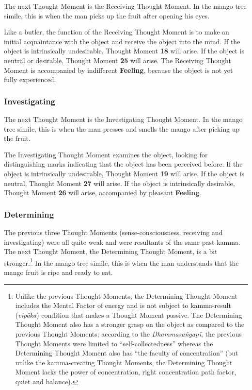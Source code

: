 The next Thought Moment is the Receiving Thought Moment. In the mango tree simile, this is when the man picks up the fruit after opening his eyes.

Like a butler, the function of the Receiving Thought Moment is to make an initial acquaintance with the object and receive the object into the mind. If the object is intrinsically undesirable, Thought Moment \textbf{18} will arise. If the object is neutral or desirable, Thought Moment \textbf{25} will arise. The Receiving Thought Moment is accompanied by indifferent \textbf{Feeling}, because the object is not yet fully experienced.

\subsubsection*{Investigating}

The next Thought Moment is the Investigating Thought Moment. In the mango tree simile, this is when the man presses and smells the mango after picking up the fruit.

The Investigating Thought Moment examines the object, looking for distinguishing marks indicating that the object has been perceived before. If the object is intrinsically undesirable, Thought Moment \textbf{19} will arise. If the object is neutral, Thought Moment \textbf{27} will arise. If the object is intrinsically desirable, Thought Moment \textbf{26} will arise, accompanied by pleasant \textbf{Feeling}.

\subsubsection*{Determining}

The previous three Thought Moments (sense-consciousness, receiving and investigating) were all quite weak and were resultants of the same past kamma. The next Thought Moment, the Determining Thought Moment, is a bit stronger.\footnote{Unlike the previous Thought Moments, the Determining Thought Moment includes the Mental Factor of energy and is not subject to kamma-result (\textit{vipāka}) condition that makes a Thought Moment passive. The Determining Thought Moment also has a stronger grasp on the object as compared to the previous Thought Moments; according to the \textit{Dhammasaṅgaṇī}, the previous Thought Moments were limited to “self-collectedness” whereas the Determining Thought Moment also has “the faculty of concentration” (but unlike the kamma-creating Thought Moments, the Determining Thought Moment lacks the power of concentration, right concentration path factor, quiet and balance).} In the mango tree simile, this is when the man understands that the mango fruit is ripe and ready to eat.

